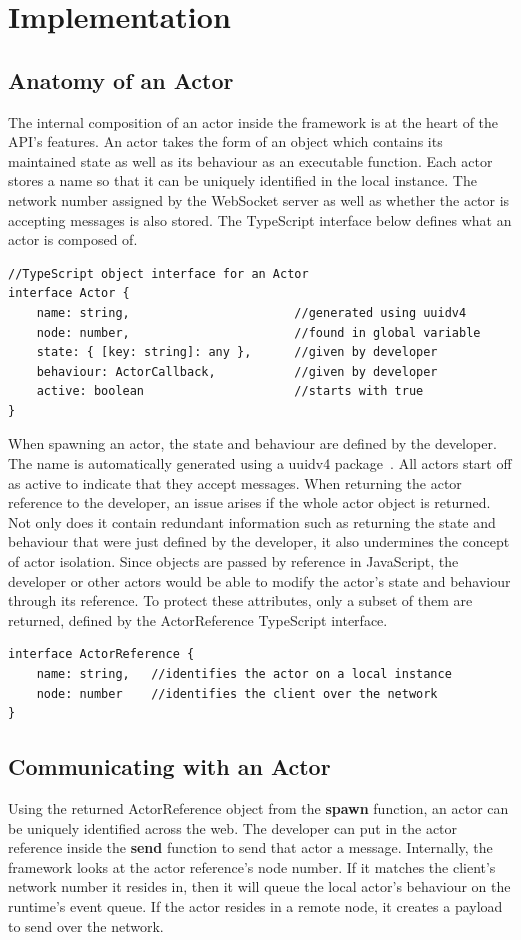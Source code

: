 \documentclass[oneside]{um-fict}
\begin{document}
\section{Implementation}
\subsection{Anatomy of an Actor}
The internal composition of an actor inside the framework is at the heart of the API's features. An actor takes the form of an object which contains its maintained state as well as its behaviour as an executable function. Each actor stores a name so that it can be uniquely identified in the local instance. The network number assigned by the WebSocket server as well as whether the actor is accepting messages is also stored. The TypeScript interface below defines what an actor is composed of.
\begin{lstlisting}
//TypeScript object interface for an Actor
interface Actor {
    name: string,                       //generated using uuidv4
    node: number,                       //found in global variable
    state: { [key: string]: any },      //given by developer
    behaviour: ActorCallback,           //given by developer
    active: boolean                     //starts with true
}
\end{lstlisting}
When spawning an actor, the state and behaviour are defined by the developer. The name is automatically generated using a uuidv4 package~\cite{uuidv4}. All actors start off as active to indicate that they accept messages. When returning the actor reference to the developer, an issue arises if the whole actor object is returned. Not only does it contain redundant information such as returning the state and behaviour that were just defined by the developer, it also undermines the concept of actor isolation. Since objects are passed by reference in JavaScript, the developer or other actors would be able to modify the actor's state and behaviour through its reference. To protect these attributes, only a subset of them are returned, defined by the ActorReference TypeScript interface.
\begin{lstlisting}
interface ActorReference {
    name: string,   //identifies the actor on a local instance
    node: number    //identifies the client over the network
}
\end{lstlisting}
\subsection{Communicating with an Actor}
Using the returned ActorReference object from the \textbf{spawn} function, an actor can be uniquely identified across the web. The developer can put in the actor reference inside the \textbf{send} function to send that actor a message. Internally, the framework looks at the actor reference's node number. If it matches the client's network number it resides in, then it will queue the local actor's behaviour on the runtime's event queue. If the actor resides in a remote node, it creates a payload to send over the network. 
\end{document}
